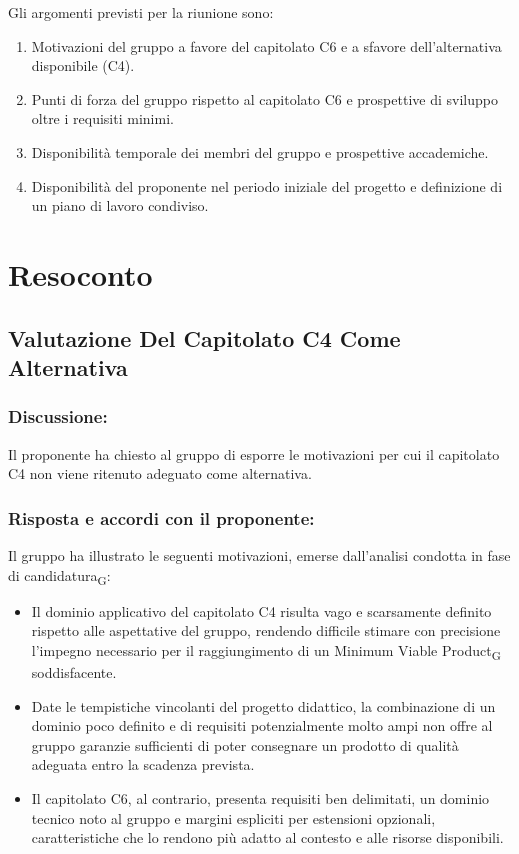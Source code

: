 Gli argomenti previsti per la riunione sono:
 
\begin{enumerate}
    \item Motivazioni del gruppo a favore del capitolato C6 e a sfavore
          dell'alternativa disponibile (C4).
    \item Punti di forza del gruppo rispetto al capitolato C6 e prospettive
          di sviluppo oltre i requisiti minimi.
    \item Disponibilità temporale dei membri del gruppo e prospettive accademiche.
    \item Disponibilità del proponente nel periodo iniziale del progetto e
          definizione di un piano di lavoro condiviso.
\end{enumerate}

\section{Resoconto}
 
\subsection{Valutazione Del Capitolato C4 Come Alternativa}
 
\subsubsection*{Discussione:}
Il proponente ha chiesto al gruppo di esporre le motivazioni per cui il capitolato
C4 non viene ritenuto adeguato come alternativa.
 
\subsubsection*{Risposta e accordi con il proponente:}
 
Il gruppo ha illustrato le seguenti motivazioni, emerse dall'analisi condotta
in fase di candidatura\textsubscript{G}:
 
\begin{itemize}
    \item Il dominio applicativo del capitolato C4 risulta vago e scarsamente
          definito rispetto alle aspettative del gruppo, rendendo difficile
          stimare con precisione l'impegno necessario per il raggiungimento
          di un Minimum Viable Product\textsubscript{G} soddisfacente.
    \item Date le tempistiche vincolanti del progetto didattico, la combinazione
          di un dominio poco definito e di requisiti potenzialmente molto ampi
          non offre al gruppo garanzie sufficienti di poter consegnare un
          prodotto di qualità adeguata entro la scadenza prevista.
    \item Il capitolato C6, al contrario, presenta requisiti ben delimitati,
          un dominio tecnico noto al gruppo e margini espliciti per estensioni
          opzionali, caratteristiche che lo rendono più adatto al contesto
          e alle risorse disponibili.
\end{itemize}
 
